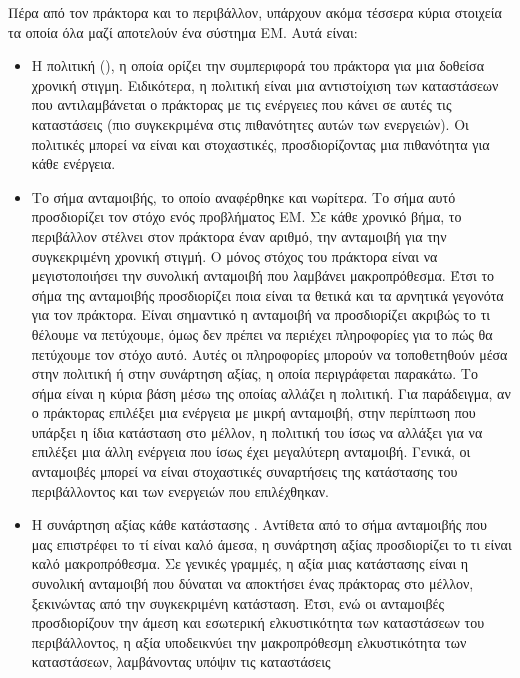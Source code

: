 Πέρα από τον πράκτορα και το περιβάλλον, υπάρχουν ακόμα τέσσερα κύρια στοιχεία τα οποία όλα μαζί αποτελούν
ένα σύστημα ΕΜ. Αυτά είναι:
\begin{itemize}
    \item Η πολιτική (), η οποία ορίζει την συμπεριφορά του πράκτορα για μια δοθείσα
          χρονική στιγμη. Ειδικότερα, η πολιτική είναι μια αντιστοίχιση των καταστάσεων
          που αντιλαμβάνεται ο πράκτορας με τις ενέργειες που κάνει σε αυτές τις καταστάσεις (πιο συγκεκριμένα στις πιθανότητες αυτών των ενεργειών). Οι
          πολιτικές μπορεί να είναι και στοχαστικές, προσδιορίζοντας μια πιθανότητα για κάθε ενέργεια.
    \item Το σήμα ανταμοιβής, το οποίο αναφέρθηκε και νωρίτερα. Το σήμα αυτό προσδιορίζει τον στόχο ενός προβλήματος
          ΕΜ. Σε κάθε χρονικό βήμα, το περιβάλλον στέλνει στον πράκτορα έναν αριθμό, την ανταμοιβή για την συγκεκριμένη χρονική στιγμή.
          Ο μόνος στόχος του πράκτορα είναι να μεγιστοποιήσει την συνολική ανταμοιβή που λαμβάνει
          μακροπρόθεσμα. Έτσι το σήμα της ανταμοιβής προσδιορίζει ποια είναι τα θετικά και τα αρνητικά
          γεγονότα για τον πράκτορα. Είναι σημαντικό η ανταμοιβή να προσδιορίζει ακριβώς το
          τι θέλουμε να πετύχουμε, όμως δεν πρέπει να περιέχει πληροφορίες για το πώς θα πετύχουμε τον στόχο αυτό.
          Αυτές οι πληροφορίες μπορούν να τοποθετηθούν μέσα στην πολιτική ή στην συνάρτηση αξίας, η οποία περιγράφεται παρακάτω.
          Το σήμα είναι η κύρια βάση μέσω της οποίας αλλάζει η πολιτική.
          Για παράδειγμα, αν ο πράκτορας επιλέξει μια ενέργεια με μικρή ανταμοιβή, στην περίπτωση που υπάρξει η ίδια κατάσταση στο μέλλον,
          η πολιτική του ίσως να αλλάξει για να επιλέξει μια άλλη ενέργεια που ίσως έχει μεγαλύτερη ανταμοιβή. Γενικά, οι
          ανταμοιβές μπορεί να είναι στοχαστικές συναρτήσεις της κατάστασης του περιβάλλοντος και των
          ενεργειών που επιλέχθηκαν.
    \item Η συνάρτηση αξίας κάθε κατάστασης . Αντίθετα από το σήμα
          ανταμοιβής που μας επιστρέφει το τί είναι καλό άμεσα, η συνάρτηση αξίας προσδιορίζει το τι είναι καλό μακροπρόθεσμα.
          Σε γενικές γραμμές, η αξία μιας κατάστασης είναι η συνολική ανταμοιβή που δύναται
          να αποκτήσει ένας πράκτορας στο μέλλον, ξεκινώντας από την συγκεκριμένη κατάσταση. Έτσι,
          ενώ οι ανταμοιβές προσδιορίζουν την άμεση και εσωτερική ελκυστικότητα των καταστάσεων του περιβάλλοντος,
          η αξία υποδεικνύει την μακροπρόθεσμη ελκυστικότητα των καταστάσεων, λαμβάνοντας υπόψιν τις καταστάσεις

\end{itemize}
